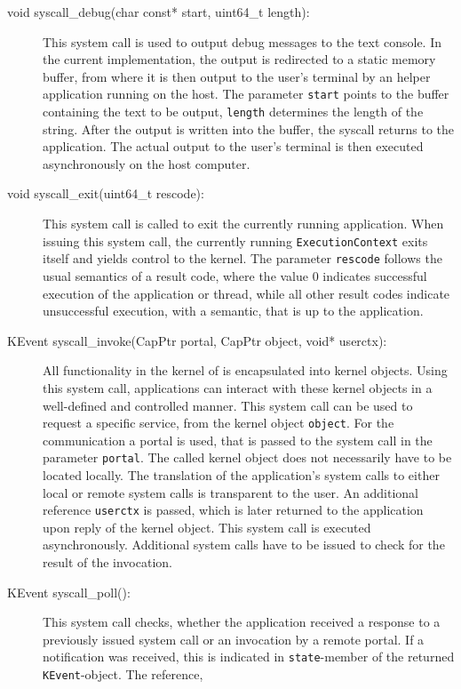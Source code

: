 \begin{description}
\item[void syscall\_debug(char const* start, uint64\_t length):] This system
call is used to output debug messages to the text console. In the current
implementation, the output is redirected to a static memory buffer, from where
it is then output to the user's terminal by an helper application running on the
\mythos host. The parameter \texttt{start} points to the buffer containing the
text to be output, \texttt{length} determines the length of the string. After
the output is written into the buffer, the syscall returns to the application.
The actual output to the user's terminal is then executed asynchronously on the
host computer.
\item[void syscall\_exit(uint64\_t rescode):] This system call is called to exit
the currently running application. When issuing this system call, the currently
running \texttt{ExecutionContext} exits itself and yields control to the kernel.
The parameter \texttt{rescode} follows the usual semantics of a result code,
where the value $0$ indicates successful execution of the application or thread,
while all other result codes indicate unsuccessful execution, with a semantic,
that is up to the application.
\item[KEvent syscall\_invoke(CapPtr portal, CapPtr object, void* userctx):] All
functionality in the kernel of \mythos is encapsulated into kernel objects.
Using this system call, applications can interact with these kernel objects in a
well-defined and controlled manner. This system call can be used to request a
specific service, from the kernel object \texttt{object}. For the communication
a portal is used, that is passed to the system call in the parameter
\texttt{portal}. The called kernel object does not necessarily have to be
located locally. The translation of the application's system calls to either
local or remote system calls is transparent to the user. An additional reference
\texttt{userctx} is passed, which is later returned to the application upon
reply of the kernel object. This system call is executed asynchronously.
Additional system calls have to be issued to check for the result of the
invocation.
\item[KEvent syscall\_poll():] This system call checks, whether the application
received a response to a previously issued system call or an invocation by a
remote portal. If a notification was received, this is indicated in
\texttt{state}-member of the returned \texttt{KEvent}-object. The reference,

\end{description}
